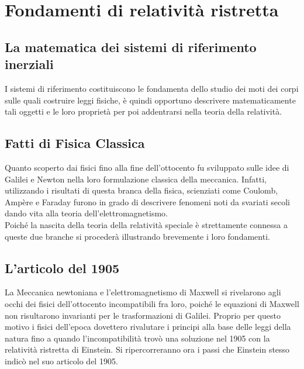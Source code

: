 \documentclass[12pt,a4paper]{book}
\numberwithin{equation}{section}
\begin{document}
\begin{sloppypar}
\frontmatter
\null\newpage

 
\tableofcontents
\mainmatter



\chapter{Fondamenti di relatività ristretta}

\section{La matematica dei sistemi di riferimento inerziali}
\label{sec:MathSDRI}
I sistemi di riferimento costituiscono le fondamenta dello studio dei moti dei corpi sulle quali costruire leggi fisiche, è quindi opportuno descrivere matematicamente tali oggetti e le loro proprietà per poi addentrarsi nella teoria della relatività.



\section{Fatti di Fisica Classica}
Quanto scoperto dai fisici fino alla fine dell'ottocento fu sviluppato sulle idee di Galilei e Newton nella loro formulazione classica della meccanica. Infatti, utilizzando i risultati di questa branca della fisica, scienziati come Coulomb, Ampère e Faraday furono in grado di descrivere fenomeni noti da svariati secoli dando vita alla teoria dell'elettromagnetismo.\\
Poiché la nascita della teoria della relatività speciale è strettamente connessa a queste due branche si procederà illustrando brevemente i loro fondamenti. 





\section{L'articolo del 1905}
La Meccanica newtoniana e l'elettromagnetismo di Maxwell si rivelarono agli occhi dei fisici dell'ottocento 
incompatibili fra loro, 
poiché le equazioni di Maxwell non risultarono invarianti per le trasformazioni di Galilei. 
Proprio per questo motivo i fisici dell'epoca dovettero rivalutare i principi alla base delle leggi 
della natura fino a quando l'incompatibilità trovò una soluzione nel 1905 con la relatività ristretta di Einstein.
Si ripercorreranno ora i passi che Einstein stesso indicò nel suo articolo \cite{Einstein1905} del 1905.




\end{sloppypar}
\end{document}
